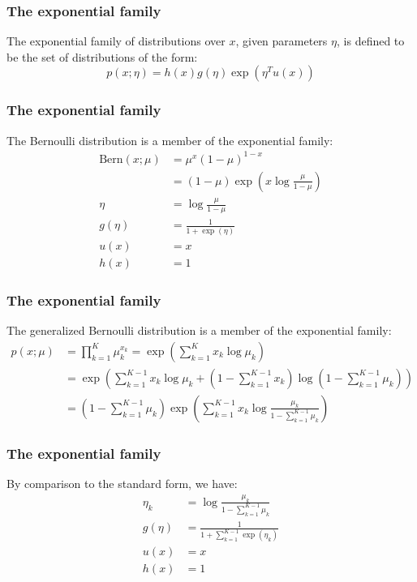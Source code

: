 \documentclass{beamer}
\begin{document}
\begin{frame}
    \frametitle{The exponential family}
    The exponential family of distributions over $x$, given parameters $\eta$, is defined to be the set of distributions of the form:
    \begin{equation*}
        p(x;\eta)=h(x)g(\eta)\exp(\eta^{T}u(x))
    \end{equation*}
\end{frame}

\begin{frame}
    \frametitle{The exponential family}
    The Bernoulli distribution is a member of the exponential family:
    \begin{align*}
        \mathrm{Bern}(x;\mu)&=\mu^{x}(1-\mu)^{1-x} \\
        &=(1-\mu)\exp(x\log\frac{\mu}{1-\mu}) \\
        \eta&=\log\frac{\mu}{1-\mu} \\
        g(\eta)&=\frac{1}{1+\exp(\eta)} \\
        u(x)&=x \\
        h(x)&=1
    \end{align*}
\end{frame}

\begin{frame}
    \frametitle{The exponential family}
    The generalized Bernoulli distribution is a member of the exponential family:
    \begin{align*}
        p(x;\mu)&=\prod_{k=1}^{K}\mu_{k}^{x_{k}}=\exp(\sum_{k=1}^{K}x_{k}\log\mu_{k}) \\
        &=\exp(\sum_{k=1}^{K-1}x_{k}\log\mu_{k}+(1-\sum_{k=1}^{K-1}x_{k})\log(1-\sum_{k=1}^{K-1}\mu_{k})) \\
        &=(1-\sum_{k=1}^{K-1}\mu_{k})\exp(\sum_{k=1}^{K-1}x_{k}\log\frac{\mu_{k}}{1-\sum_{k=1}^{K-1}\mu_{k}})
    \end{align*}
\end{frame}

\begin{frame}
    \frametitle{The exponential family}
    By comparison to the standard form, we have:
    \begin{align*}
        \eta_{k}&=\log\frac{\mu_{k}}{1-\sum_{k=1}^{K-1}\mu_{k}} \\
        g(\eta)&=\frac{1}{1+\sum_{k=1}^{K-1}\exp(\eta_{k})} \\
        u(x)&=x \\
        h(x)&=1
    \end{align*}
\end{frame}
\end{document}
